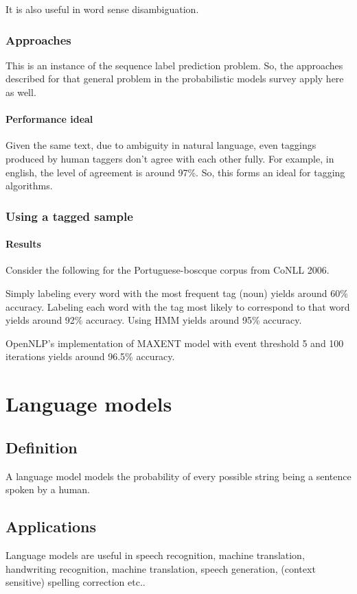 \documentclass[oneside, article]{memoir}
\begin{document}
It is also useful in word sense disambiguation.

\subsection{Approaches}
This is an instance of the sequence label prediction problem. So, the approaches described for that general problem in the probabilistic models survey apply here as well.

\subsubsection{Performance ideal}
Given the same text, due to ambiguity in natural language, even taggings produced by human taggers don't agree with each other fully. For example, in english, the level of agreement is around 97\%. So, this forms an ideal for tagging algorithms.

\subsection{Using a tagged sample}
\subsubsection{Results}
Consider the following for the Portuguese-boscque corpus from CoNLL 2006.

Simply labeling every word with the most frequent tag (noun) yields around 60\% accuracy. Labeling each word with the tag most likely to correspond to that word yields around 92\% accuracy. Using HMM yields around 95\% accuracy.

OpenNLP's implementation of MAXENT model with event threshold 5 and 100 iterations yields around 96.5\% accuracy.

\chapter{Language models}
\section{Definition}
A language model models the probability of every possible string being a sentence spoken by a human.

\section{Applications}
Language models are useful in speech recognition, machine translation, handwriting recognition, machine translation, speech generation, (context sensitive) spelling correction etc..
\end{document}
